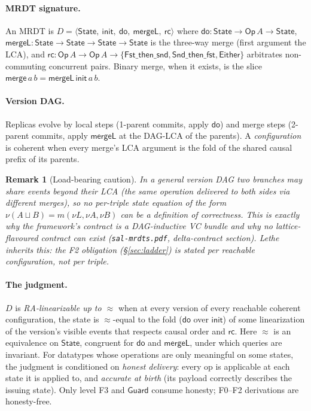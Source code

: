 \documentclass[11pt]{article}
\newtheorem{remark}[theorem]{Remark}
\newcommand{\Merge}{\mathsf{merge}}
\newcommand{\mergeL}{\mathsf{mergeL}}
\newcommand{\lean}[1]{\texttt{#1}}
\newcommand{\dodo}{\mathsf{do}}
\newcommand{\eqobs}{\approx}
\newcommand{\rc}{\mathsf{rc}}
\newcommand{\Guard}{\mathsf{Guard}}
\newcommand{\State}{\mathsf{State}}
\newcommand{\init}{\mathsf{init}}
\newcommand{\Op}{\mathsf{Op}}
\newcommand{\Either}{\mathsf{Either}}
\begin{document}
\paragraph{MRDT signature.} An MRDT is
$D = \langle \State,\ \init,\ \dodo,\ \mergeL,\ \rc \rangle$
where $\dodo : \State \to \Op\,A \to \State$,
$\mergeL : \State \to \State \to \State \to \State$ is the three-way merge
(first argument the LCA), and
$\rc : \Op\,A \to \Op\,A \to \{\mathsf{Fst\_then\_snd},
\mathsf{Snd\_then\_fst}, \Either\}$
arbitrates non-commuting concurrent pairs. Binary merge, when it exists,
is the slice $\Merge\,a\,b = \mergeL\,\init\,a\,b$.

\paragraph{Version DAG.} Replicas evolve by local steps (1-parent commits,
apply $\dodo$) and merge steps (2-parent commits, apply $\mergeL$ at the
DAG-LCA of the parents). A \emph{configuration} is coherent when every
merge's LCA argument is the fold of the shared causal prefix of its
parents.

\begin{remark}[Load-bearing caution]\label{rem:caution}
In a general version DAG two branches may share events \emph{beyond} their
LCA (the same operation delivered to both sides via different merges), so
no per-triple state equation of the form
$\nu(A \sqcup B) = m(\nu L, \nu A, \nu B)$ can be a \emph{definition} of
correctness. This is exactly why the framework's contract is a
DAG-inductive VC bundle and why no lattice-flavoured contract can exist
(\lean{sal-mrdts.pdf}, delta-contract section). Lethe inherits this:
the F2 obligation (\S\ref{sec:ladder}) is stated per \emph{reachable
configuration}, not per triple.
\end{remark}

\paragraph{The judgment.} $D$ is \emph{RA-linearizable up to $\eqobs$}
when at every version of every reachable coherent configuration, the state
is $\eqobs$-equal to the fold ($\dodo$ over $\init$) of some linearization
of the version's visible events that respects causal order and $\rc$.
Here $\eqobs$ is an equivalence on $\State$, congruent for $\dodo$ and
$\mergeL$, under which queries are invariant. For datatypes whose
operations are only meaningful on some states, the judgment is conditioned
on \emph{honest delivery}: every op is applicable at each state it is
applied to, and \emph{accurate at birth} (its payload correctly describes
the issuing state). Only level F3 and $\Guard$ consume honesty; F0--F2
derivations are honesty-free.
\end{document}
